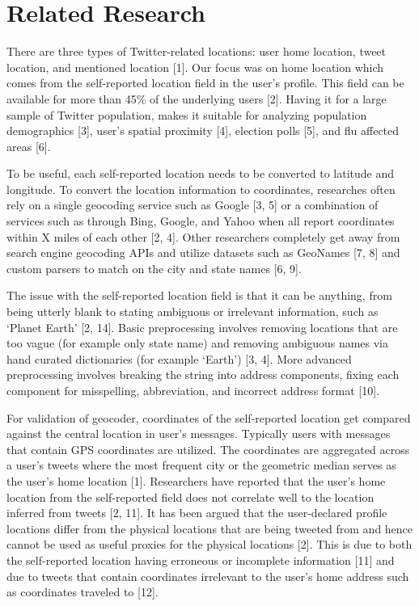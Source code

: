 \section{Related Research}

There are three types of Twitter-related locations: user home location, tweet location, and mentioned location [1]. Our focus was on home location which comes from the self-reported location field in the user's profile. This field can be available for more than 45\% of the underlying users [2]. Having it for a large sample of Twitter population, makes it suitable for analyzing population demographics [3], user's spatial proximity [4], election polls [5], and flu affected areas [6].

To be useful, each self-reported location needs to be converted to latitude and longitude. To convert the location information to coordinates, researches often rely on a single geocoding service such as Google [3, 5] or a combination of services such as through Bing, Google, and Yahoo when all report coordinates within X miles of each other [2, 4]. Other researchers completely get away from search engine geocoding APIs and utilize datasets such as GeoNames [7, 8] and custom parsers to match on the city and state names [6, 9]. 

The issue with the self-reported location field is that it can be anything, from being utterly blank to stating ambiguous or irrelevant information, such as `Planet Earth' [2, 14]. Basic preprocessing involves removing locations that are too vague (for example only state name) and removing ambiguous names via hand curated dictionaries (for example `Earth') [3, 4]. More advanced preprocessing involves breaking the string into address components, fixing each component for misspelling, abbreviation, and incorrect address format [10]. 

For validation of geocoder, coordinates of the self-reported location get compared against the central location in user's messages. Typically users with messages that contain GPS coordinates are utilized. The coordinates are aggregated across a user's tweets where the most frequent city or the geometric median serves as the user's home location [1]. Researchers have reported that the user's home location from the self-reported field does not correlate well to the location inferred from tweets [2, 11]. It has been argued that the user-declared profile locations differ from the physical locations that are being tweeted from and hence cannot be used as useful proxies for the physical locations [2]. This is due to both the self-reported location having erroneous or incomplete information [11] and due to tweets that contain coordinates irrelevant to the user's home address such as coordinates traveled to [12].

